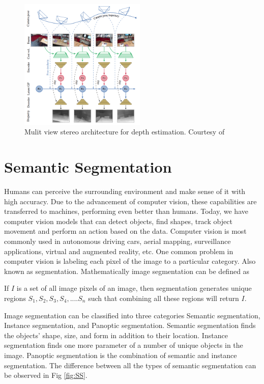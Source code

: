     \begin{figure}
    	\centering
    	\includegraphics[width=6cm]{images/MVS.png}
    	\caption{Mulit view stereo architecture for depth estimation. Courtesy of \cite{52_hou2019multi}}
    	\label{fig:mvs}
    \end{figure} 	

    \section{Semantic Segmentation}
    \label{sec:semseg}
    
    Humans can perceive the surrounding environment and make sense of it with high accuracy. Due to the advancement of computer vision, these capabilities are transferred to machines, performing even better than humans. Today, we have computer vision models that can detect objects, find shapes, track object movement and perform an action based on the data. Computer vision is most commonly used in autonomous driving cars, aerial mapping, surveillance applications, virtual and augmented reality, etc. One common problem in computer vision is labeling each pixel of the image to a particular category. Also known as segmentation. Mathematically image segmentation can be defined as

	If $I$ is a set of all image pixels of an image, then segmentation generates unique regions ${S_1, S_2, S_3, S_4,....S_n}$ such that combining all these regions will return $I$. 
	
	Image segmentation can be classified into three categories Semantic segmentation, Instance segmentation, and Panoptic segmentation. 
	Semantic segmentation finds the objects' shape, size, and form in addition to their location. Instance segmentation finds one more parameter of a number of unique objects in the image. Panoptic segmentation is the combination of semantic and instance segmentation. The difference between all the types of semantic segmentation can be observed in Fig \ref{fig:SS}.
    
